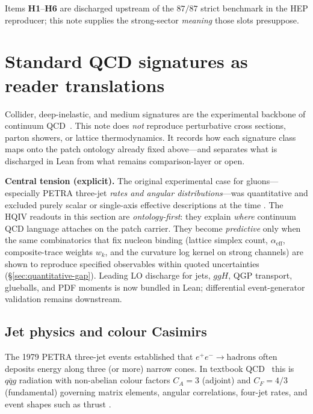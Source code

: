 \documentclass[11pt]{amsart}
\begin{document}
Items \textbf{H1}--\textbf{H6} are discharged upstream of the $87/87$ strict
benchmark in the HEP reproducer; this note supplies the strong-sector \emph{meaning}
those slots presuppose.

\section{Standard QCD signatures as reader translations}
\label{sec:qcd-comparison}

Collider, deep-inelastic, and medium signatures are the experimental backbone of
continuum QCD~\cite{bartel1979,berger1979,bloom1969,friedman1972,bjorken1969,drell1970,peskin1995,pdg2024}. This note does \emph{not} reproduce perturbative cross sections,
parton showers, or lattice thermodynamics. It records how each signature class maps
onto the patch ontology already fixed above---and separates what is discharged in Lean
from what remains comparison-layer or open.

\medskip
\noindent\textbf{Central tension (explicit).}
The original experimental case for gluons---especially PETRA three-jet \emph{rates and
angular distributions}---was quantitative and excluded purely scalar or single-axis
effective descriptions at the time \cite{bartel1979,berger1979,peskin1995}. The HQIV
readouts in this section are \emph{ontology-first}: they explain \emph{where} continuum
QCD language attaches on the patch carrier. They become \emph{predictive} only when
the same combinatorics that fix nucleon binding (lattice simplex count,
$\alpha_{\mathrm{eff}}$, composite-trace weights $w_k$, and the curvature log kernel
on strong channels) are shown to reproduce specified observables within quoted
uncertainties (\S\ref{sec:quantitative-gap}). Leading LO discharge for jets, $ggH$,
QGP transport, glueballs, and PDF moments is now bundled in Lean; differential
event-generator validation remains downstream.

\subsection{Jet physics and colour Casimirs}
\label{subsec:jets}

The 1979 PETRA three-jet events \cite{bartel1979,berger1979,peskin1995} established
that $e^+e^-\to\mathrm{hadrons}$ often deposits energy along three (or more) narrow
cones. In textbook QCD~\cite{peskin1995,pdg2024} this is $q\bar qg$ radiation with
non-abelian colour factors
$C_A=3$ (adjoint) and $C_F=4/3$ (fundamental) governing matrix elements, angular
correlations, four-jet rates, and event shapes such as thrust
\cite{peskin1995,pdg2024}.
\end{document}
